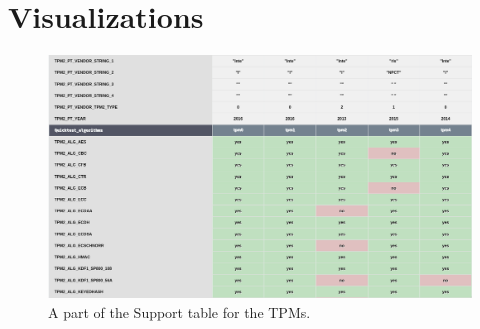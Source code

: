 \renewcommand{\thechapter}{B}
\chapter{Visualizations}\label{appendix:diagrams-visualizations}


\begin{landscape}
    \begin{figure}[!t]
        \includegraphics[width=\linewidth, height=\textwidth,keepaspectratio]{img/visualizations/tpm-support-data.png}
        \caption{A part of the Support table for the TPMs.}
    \end{figure}
\end{landscape}

